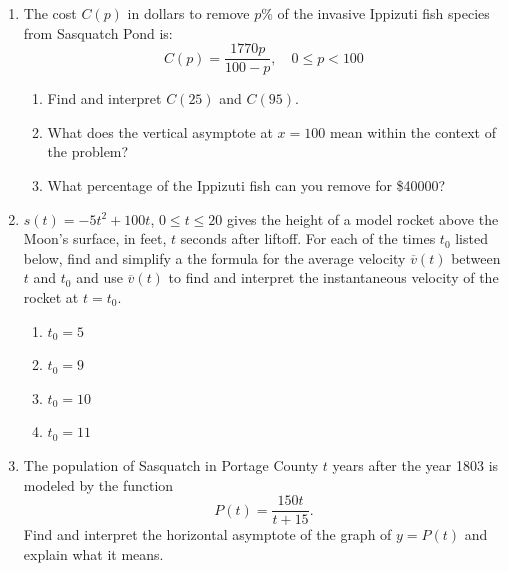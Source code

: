 \newpage

\begin{enumerate}
\setcounter{enumi}{\value{HW}}



\item The cost $C(p)$ in dollars to remove $p$\% of the invasive  Ippizuti fish species from Sasquatch Pond is: \[C(p) = \frac{1770p}{100 - p}, \quad 0 \leq p < 100 \]

\begin{enumerate}

\item Find and interpret $C(25)$ and $C(95)$.
\item What does the vertical asymptote at $x = 100$ mean within the context of the problem?  
\item What percentage of the Ippizuti fish can you remove for  \$40000?

\end{enumerate}

\item  {} $s(t) = -5t^2+100t$, $0 \leq t \leq 20$ gives the height of a model rocket above the Moon's surface, in feet,  $t$ seconds after liftoff.  For each of the times $t_{0}$ listed below, find and simplify a the formula for the average velocity $\overline{v}(t)$ between $t$ and $t_{0}$  and use $\overline{v}(t)$ to find and interpret the instantaneous velocity of the rocket at $t = t_{0}$.

\begin{multicols}{4}

\begin{enumerate}

\item  $t_{0} = 5$

\item $t_{0} = 9$

\item $t_{0} = 10$

\item  $t_{0} = 11$

\end{enumerate}

\end{multicols}


\item \label{squatchpop} The population of Sasquatch in Portage County $t$ years after the year 1803 is modeled by the function \[P(t) = \frac{150t}{t + 15}.\] Find and interpret the horizontal asymptote of the graph of $y = P(t)$ and explain what it means.


\end{enumerate}
